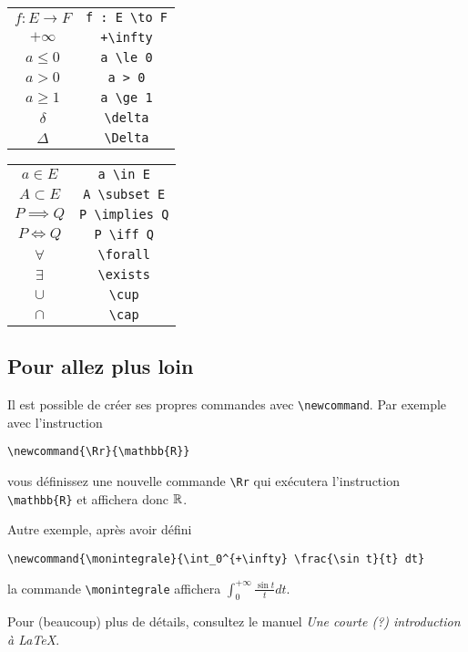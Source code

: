 \documentclass[class=report,crop=false]{standalone}
\begin{document}
\begin{center}
\begin{tabular}{cc}
$f : E \to F$ & \verb?f : E \to F?  \\
$+\infty$ & \verb?+\infty? \\
$a \le 0$ & \verb?a \le 0? \\
$a > 0$ & \verb?a > 0?  \\
$a \ge 1$ & \verb?a \ge 1? \\
$\delta$ & \verb?\delta? \\
$\Delta$ & \verb?\Delta? \\
\end{tabular}\hspace{2cm}
\begin{tabular}{cc}
$a \in E$ & \verb?a \in E? \\
$A \subset E$ & \verb?A \subset E? \\
$P \implies Q$ & \verb?P \implies Q? \\
$P \iff Q$ & \verb?P \iff Q? \\
$\forall$ & \verb?\forall? \\
$\exists$ & \verb?\exists? \\
$\cup$ & \verb?\cup? \\
$\cap$ & \verb?\cap?  \\
\end{tabular}
\end{center}

\subsection{Pour allez plus loin}

Il est possible de créer ses propres commandes avec \verb?\newcommand?.
Par exemple avec l'instruction

\hfil \verb?\newcommand{\Rr}{\mathbb{R}}?

vous définissez une nouvelle commande \verb?\Rr? qui exécutera l'instruction
\verb?\mathbb{R}? et affichera donc $\Rr$.

Autre exemple, après avoir défini

\hfil \verb?\newcommand{\monintegrale}{\int_0^{+\infty} \frac{\sin t}{t} dt}?

la commande \verb?\monintegrale? affichera $\int_0^{+\infty} \frac{\sin t}{t} dt$.

\bigskip

Pour (beaucoup) plus de détails, consultez le manuel \emph{Une courte (?) introduction à \LaTeX}.
\end{document}
